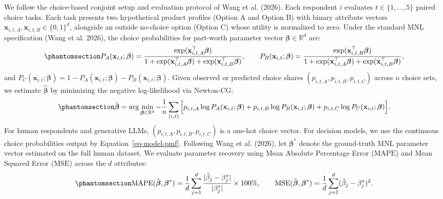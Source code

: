 \documentclass[
  letterpaper,
  DIV=11,
  numbers=noendperiod]{scrartcl}
\begin{document}
We follow the choice-based conjoint setup and evaluation protocol of
Wang et al. (2026). Each respondent \(i\) evaluates
\(t \in \{1, \dots, 5\}\) paired choice tasks. Each task presents two
hypothetical product profiles (Option A and Option B) with binary
attribute vectors
\(\mathbf{x}_{i,t,A}, \mathbf{x}_{i,t,B} \in \{0, 1\}^d\), alongside an
outside no-choice option (Option C) whose utility is normalized to zero.
Under the standard MNL specification (Wang et al. 2026), the choice
probabilities for part-worth parameter vector
\(\boldsymbol{\beta} \in \mathbb{R}^d\) are:
\begin{equation}\protect\phantomsection\label{eq-mnl-probs}{
P_A(\mathbf{x}_{i,t}; \boldsymbol{\beta}) = \frac{\exp(\mathbf{x}_{i,t,A}^\top \boldsymbol{\beta})}{1 + \exp(\mathbf{x}_{i,t,A}^\top \boldsymbol{\beta}) + \exp(\mathbf{x}_{i,t,B}^\top \boldsymbol{\beta})}, \qquad P_B(\mathbf{x}_{i,t}; \boldsymbol{\beta}) = \frac{\exp(\mathbf{x}_{i,t,B}^\top \boldsymbol{\beta})}{1 + \exp(\mathbf{x}_{i,t,A}^\top \boldsymbol{\beta}) + \exp(\mathbf{x}_{i,t,B}^\top \boldsymbol{\beta})},
}\end{equation} and
\(P_C(\mathbf{x}_{i,t}; \boldsymbol{\beta}) = 1 - P_A(\mathbf{x}_{i,t}; \boldsymbol{\beta}) - P_B(\mathbf{x}_{i,t}; \boldsymbol{\beta})\).
Given observed or predicted choice shares
\((p_{i,t,A}, p_{i,t,B}, p_{i,t,C})\) across \(n\) choice sets, we
estimate \(\hat{\boldsymbol{\beta}}\) by minimizing the negative
log-likelihood via Newton-CG:
\begin{equation}\protect\phantomsection\label{eq-mnl-mle}{
\hat{\boldsymbol{\beta}} = \arg\min_{\boldsymbol{\beta} \in \mathbb{R}^d} -\frac{1}{n} \sum_{(i,t)} \Big[ p_{i,t,A} \log P_A(\mathbf{x}_{i,t}; \boldsymbol{\beta}) + p_{i,t,B} \log P_B(\mathbf{x}_{i,t}; \boldsymbol{\beta}) + p_{i,t,C} \log P_C(\mathbf{x}_{i,t}; \boldsymbol{\beta}) \Big].
}\end{equation} For human respondents and generative LLMs,
\((p_{i,t,A}, p_{i,t,B}, p_{i,t,C})\) is a one-hot choice vector. For
decision models, we use the continuous choice probabilities output by
Equation~\ref{eq-model-pmf}. Following Wang et al. (2026), let
\(\boldsymbol{\beta}^*\) denote the ground-truth MNL parameter vector
estimated on the full human dataset. We evaluate parameter recovery
using Mean Absolute Percentage Error (\(\mathrm{MAPE}\)) and Mean
Squared Error (\(\mathrm{MSE}\)) across the \(d\) attributes:
\begin{equation}\protect\phantomsection\label{eq-wang-metrics}{
\mathrm{MAPE}(\hat{\boldsymbol{\beta}}, \boldsymbol{\beta}^*) = \frac{1}{d} \sum_{j=1}^{d} \frac{|\hat{\beta}_j - \beta^*_j|}{|\beta^*_j|} \times 100\%, \qquad \mathrm{MSE}(\hat{\boldsymbol{\beta}}, \boldsymbol{\beta}^*) = \frac{1}{d} \sum_{j=1}^{d} (\hat{\beta}_j - \beta^*_j)^2.
}\end{equation}
\end{document}
